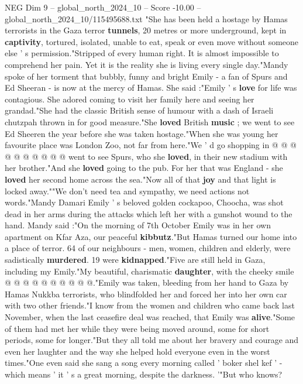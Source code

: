 \begin{textsample}{NEG Dim 9 – global\_north\_2024\_10 – Score -10.00 – global\_north\_2024\_10/115495688.txt}  \label{ex:f9_neg_043}
"She has been held a hostage by Hamas terrorists in the Gaza terror \textbf{tunnels}, 20 metres or more underground, kept in \textbf{captivity}, tortured, isolated, unable to eat, speak or even move without someone else ' s permission."Stripped of every human right.
It is almost impossible to comprehend her pain.
Yet it is the reality she is living every single day."Mandy spoke of her torment that bubbly, funny and bright Emily - a fan of Spurs and Ed Sheeran - is now at the mercy of Hamas.
She said :"Emily ' s \textbf{love} for life was contagious.
She adored coming to visit her family here and seeing her grandad."She had the classic British sense of humour with a dash of Israeli chutzpah thrown in for good measure."She \textbf{loved} British \textbf{music} ; we went to see Ed Sheeren the year before she was taken hostage."When she was young her favourite place was London Zoo, not far from here."We ' d go shopping in @ @ @ @ @ @ @ @ @ @ went to see Spurs, who she \textbf{loved}, in their new stadium with her brother."And she \textbf{loved} going to the pub.
For her that was England - she \textbf{loved} her second home across the sea."Now all of that \textbf{joy} and that light is locked away.""We don't need tea and sympathy, we need actions not words."Mandy Damari Emily ' s beloved golden cockapoo, Choocha, was shot dead in her arms during the attacks which left her with a gunshot wound to the hand.
Mandy said :"On the morning of 7th October Emily was in her own apartment on Kfar Aza, our peaceful \textbf{kibbutz}."But Hamas turned our home into a place of terror. 64 of our neighbours - men, women, children and elderly, were sadistically \textbf{murdered}. 19 were \textbf{kidnapped}."Five are still held in Gaza, including my Emily."My beautiful, charismatic \textbf{daughter}, with the cheeky smile @ @ @ @ @ @ @ @ @ @."Emily was taken, bleeding from her hand to Gaza by Hamas Nukkba terrorists, who blindfolded her and forced her into her own car with two other friends."I know from the women and children who came back last November, when the last ceasefire deal was reached, that Emily was \textbf{alive}."Some of them had met her while they were being moved around, some for short periods, some for longer."But they all told me about her bravery and courage and even her laughter and the way she helped hold everyone even in the worst times."One even said she sang a song every morning called ' boker shel kef ' - which means ' it ' s a great morning, despite the darkness. '"But who knows?

\end{textsample}
